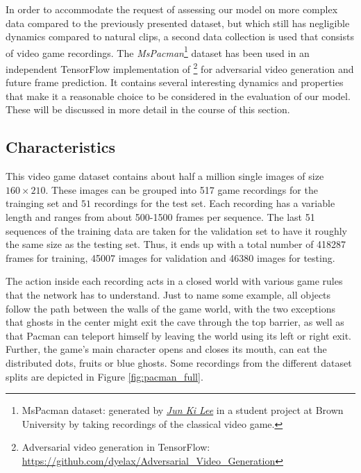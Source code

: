In order to accommodate the request of assessing our model on more complex data compared to the previously presented dataset, but which still has negligible dynamics compared to natural clips, a second data collection is used that consists of video game recordings. The \textit{MsPacman}\footnote{MsPacman dataset: generated by \href{mailto:jun_ki_lee@brown.edu}{\textit{Jun Ki Lee}} in a student project at Brown University by taking recordings of the classical video game.} dataset has been used in an independent TensorFlow implementation of \parencite{deep_multiscale_video_pred}\footnote{Adversarial video generation in TensorFlow:\\ \url{https://github.com/dyelax/Adversarial_Video_Generation}} for adversarial video generation and future frame prediction. It contains several interesting dynamics and properties that make it a reasonable choice to be considered in the evaluation of our model. These will be discussed in more detail in the course of this section.

\subsection{Characteristics}

This video game dataset contains about half a million single images of size $ 160 \times 210 $. These images can be grouped into \num{517} game recordings for the trainging set and $51$ recordings for the test set. Each recording has a variable length and ranges from about \num{500}-\num{1500} frames per sequence. The last \num{51} sequences of the training data are taken for the validation set to have it roughly the same size as the testing set. Thus, it ends up with a total number of \num{418287} frames for training, \num{45007} images for validation and \num{46380} images for testing.

The action inside each recording acts in a closed world with various game rules that the network has to understand. Just to name some example, all objects follow the path between the walls of the game world, with the two exceptions that ghosts in the center might exit the cave through the top barrier, as well as that Pacman can teleport himself by leaving the world using its left or right exit. Further, the game's main character opens and closes its mouth, can eat the distributed dots, fruits or blue ghosts. Some recordings from the different dataset splits are depicted in Figure \ref{fig:pacman_full}.

